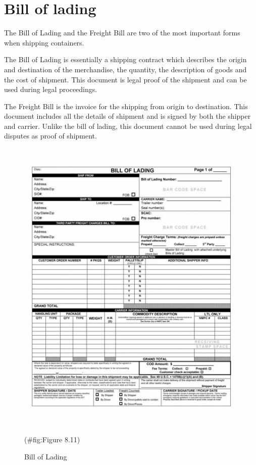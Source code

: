 \documentclass[
]{book}
\begin{document}
\hypertarget{seaport-lading}{%
\section{Bill of lading}\label{seaport-lading}}

The Bill of Lading and the Freight Bill are two of the most important forms when shipping containers.

The Bill of Lading is essentially a shipping contract which describes the origin and destination of the merchandise, the quantity, the description of goods and the cost of shipment. This document is legal proof of the shipment and can be used during legal proceedings.

The Freight Bill is the invoice for the shipping from origin to destination. This document includes all the details of shipment and is signed by both the shipper and carrier. Unlike the bill of lading, this document cannot be used during legal disputes as proof of shipment.

\begin{figure}

{\centering \includegraphics{./Images/seaport operation/Bill of Lading} 

}

\caption{Bill of Lading}(\#fig:Figure 8.11)
\end{figure}
\end{document}
